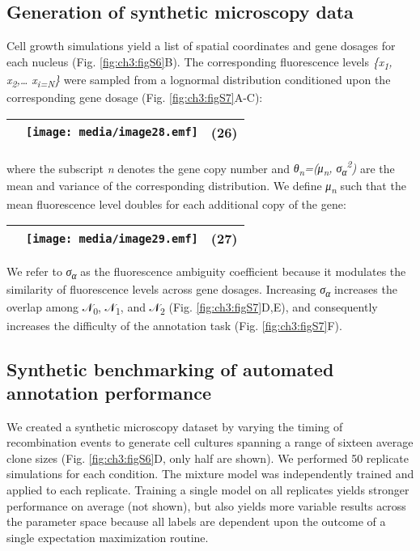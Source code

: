 \subsection{Generation of synthetic microscopy data}

Cell growth simulations yield a list of spatial coordinates and gene dosages for each nucleus (Fig. \ref{fig:ch3:figS6}B). The corresponding fluorescence levels \emph{\{x\textsubscript{1}, x\textsubscript{2},\ldots{} x\textsubscript{i=N}\}} were sampled from a lognormal distribution conditioned upon the corresponding gene dosage (Fig. \ref{fig:ch3:figS7}A-C):

\begin{longtable}[]{@{}lll@{}}
\toprule
& \texttt{[image: media/image28.emf]} & (26)\tabularnewline
\bottomrule
\end{longtable}

where the subscript \emph{n} denotes the gene copy number and \emph{θ\textsubscript{n}=(μ\textsubscript{n}, σ\textsubscript{α}\textsuperscript{2})} are the mean and variance of the corresponding distribution. We define \emph{μ\textsubscript{n}} such that the mean fluorescence level doubles for each additional copy of the gene:

\begin{longtable}[]{@{}lll@{}}
\toprule
& \texttt{[image: media/image29.emf]} & (27)\tabularnewline
\bottomrule
\end{longtable}

We refer to \emph{σ\textsubscript{α}} as the fluorescence ambiguity coefficient because it modulates the similarity of fluorescence levels across gene dosages. Increasing \emph{σ\textsubscript{α}} increases the overlap among 𝒩\textsubscript{0}, 𝒩\textsubscript{1}, and 𝒩\textsubscript{2} (Fig. \ref{fig:ch3:figS7}D,E), and consequently increases the difficulty of the annotation task (Fig. \ref{fig:ch3:figS7}F).

\subsection{Synthetic benchmarking of automated annotation performance}

We created a synthetic microscopy dataset by varying the timing of recombination events to generate cell cultures spanning a range of sixteen average clone sizes (Fig. \ref{fig:ch3:figS6}D, only half are shown). We performed 50 replicate simulations for each condition. The mixture model was independently trained and applied to each replicate. Training a single model on all replicates yields stronger performance on average (not shown), but also yields more variable results across the parameter space because all labels are dependent upon the outcome of a single expectation maximization routine.

